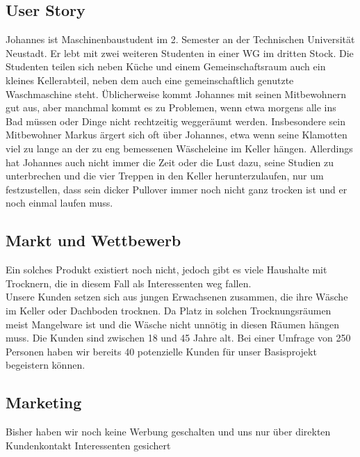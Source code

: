 \subsection{User Story}
	Johannes ist Maschinenbaustudent im 2. Semester an der Technischen Universität Neustadt. Er lebt mit zwei weiteren Studenten in einer WG im dritten Stock. Die Studenten teilen sich neben Küche und einem Gemeinschaftsraum auch ein kleines Kellerabteil, neben dem auch eine gemeinschaftlich genutzte Waschmaschine steht. Üblicherweise kommt Johannes mit seinen Mitbewohnern gut aus, aber manchmal kommt es zu Problemen, wenn etwa morgens alle ins Bad müssen oder Dinge nicht rechtzeitig weggeräumt werden. Insbesondere sein Mitbewohner Markus ärgert sich oft über Johannes, etwa wenn seine Klamotten viel zu lange an der zu eng bemessenen Wäscheleine im Keller hängen. Allerdings hat Johannes auch nicht immer die Zeit oder die Lust dazu, seine Studien zu unterbrechen und die vier Treppen in den Keller herunterzulaufen, nur um festzustellen, dass sein dicker Pullover immer noch nicht ganz trocken ist und er noch einmal laufen muss.

\subsection{Markt und Wettbewerb}
	Ein solches Produkt existiert noch nicht, jedoch gibt es viele Haushalte mit Trocknern, die in diesem Fall als Interessenten weg fallen. \\

	Unsere Kunden setzen sich aus jungen Erwachsenen zusammen, die ihre Wäsche im Keller oder Dachboden trocknen. Da Platz in solchen Trocknungsräumen meist Mangelware ist und die Wäsche nicht unnötig in diesen Räumen hängen muss. Die Kunden sind zwischen 18 und 45 Jahre alt. Bei einer Umfrage von 250 Personen haben wir bereits 40 potenzielle Kunden für unser Basisprojekt begeistern können.

\subsection{Marketing}
		Bisher haben wir noch keine Werbung geschalten und uns nur über direkten Kundenkontakt Interessenten gesichert


